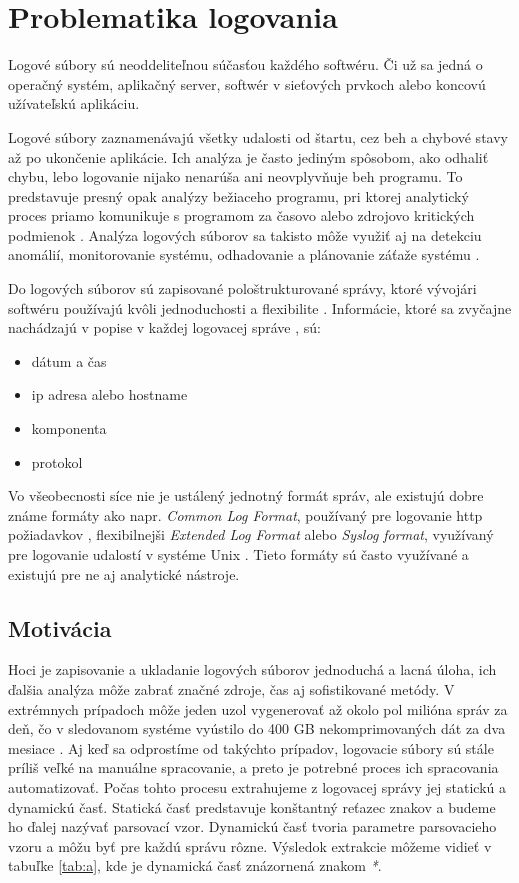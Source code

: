 \chapter{Problematika logovania}

Logové súbory sú neoddeliteľnou súčasťou každého softwéru. Či už sa jedná o operačný systém, aplikačný server, softwér v sieťových prvkoch alebo koncovú užívateľskú aplikáciu. 
\par Logové súbory zaznamenávajú všetky udalosti od štartu, cez beh a chybové stavy až po ukončenie aplikácie. Ich analýza je často jediným spôsobom, ako odhaliť chybu, lebo logovanie nijako nenarúša ani neovplyvňuje beh programu. To predstavuje presný opak analýzy bežiaceho programu, pri ktorej analytický proces priamo komunikuje s programom za časovo alebo zdrojovo kritických podmienok  \parencite{jvaldman}. Analýza logových súborov sa takisto môže využiť aj na detekciu anomálií, monitorovanie systému, odhadovanie a plánovanie záťaže systému \parencite{logengineering}.
\par Do logových súborov sú zapisované pološtrukturované správy, ktoré vývojári softwéru používajú kvôli jednoduchosti a flexibilite \parencite{he2016, ibm}. Informácie, ktoré sa zvyčajne nachádzajú v popise v každej logovacej správe \parencite{weblog, datapreprocessing, sshd}, sú:
\begin{itemize}
  \item dátum a čas
  \item ip adresa alebo hostname
  \item komponenta
  \item protokol
\end{itemize}
\par Vo všeobecnosti síce nie je ustálený jednotný formát správ, ale existujú dobre známe formáty ako napr. \emph{Common Log Format}, používaný pre logovanie http požiadavkov \parencite{CLF} , flexibilnejši \emph{Extended Log Format} \parencite{ELF} alebo \emph{Syslog format}, využívaný pre logovanie udalostí v systéme Unix \parencite{syslog}. Tieto formáty sú často využívané a existujú pre ne aj analytické nástroje. \

\section{Motivácia}

\par Hoci je zapisovanie a ukladanie logových súborov jednoduchá a lacná úloha, ich ďalšia analýza môže zabrať značné zdroje, čas aj sofistikované metódy. V extrémnych prípadoch môže jeden uzol vygenerovať až okolo pol milióna správ za deň, čo v sledovanom systéme vyústilo do 400 GB nekomprimovaných dát za dva mesiace \parencite{google}. Aj keď sa odprostíme od takýchto prípadov, logovacie súbory sú stále príliš veľké na manuálne spracovanie, a preto je potrebné proces ich spracovania automatizovať. Počas tohto procesu extrahujeme z logovacej správy jej statickú a dynamickú časť. Statická časť predstavuje konštantný reťazec znakov a budeme ho ďalej nazývať parsovací vzor. Dynamickú časť tvoria parametre parsovacieho vzoru a môžu byť pre každú správu rôzne. Výsledok extrakcie môžeme vidieť v tabuľke \ref{tab:a}, kde je dynamická časť znázornená znakom \emph{*}. 


